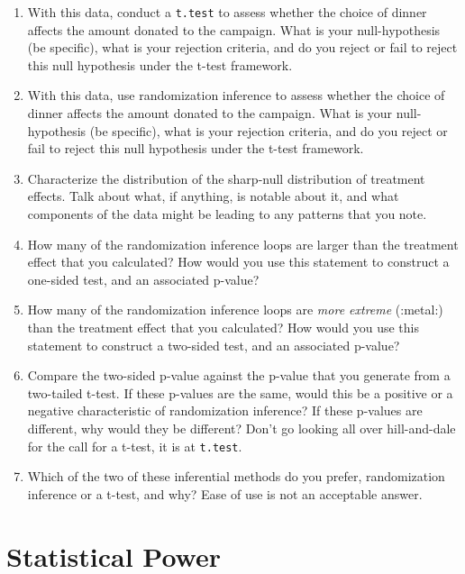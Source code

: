 \documentclass[
]{book}
\begin{document}
\begin{enumerate}
\def\labelenumi{\arabic{enumi}.}
\item
  With this data, conduct a \texttt{t.test} to assess whether the choice
  of dinner affects the amount donated to the campaign. What is your
  null-hypothesis (be specific), what is your rejection criteria, and do
  you reject or fail to reject this null hypothesis under the t-test
  framework.
\item
  With this data, use randomization inference to assess whether the
  choice of dinner affects the amount donated to the campaign. What is
  your null-hypothesis (be specific), what is your rejection criteria,
  and do you reject or fail to reject this null hypothesis under the
  t-test framework.
\item
  Characterize the distribution of the sharp-null distribution of
  treatment effects. Talk about what, if anything, is notable about it,
  and what components of the data might be leading to any patterns that
  you note.
\item
  How many of the randomization inference loops are larger than the
  treatment effect that you calculated? How would you use this statement
  to construct a one-sided test, and an associated p-value?
\item
  How many of the randomization inference loops are \emph{more extreme}
  (:metal:) than the treatment effect that you calculated? How would you
  use this statement to construct a two-sided test, and an associated
  p-value?
\item
  Compare the two-sided p-value against the p-value that you generate
  from a two-tailed t-test. If these p-values are the same, would this
  be a positive or a negative characteristic of randomization inference?
  If these p-values are different, why would they be different? Don't go
  looking all over hill-and-dale for the call for a t-test, it is at
  \texttt{t.test}.
\item
  Which of the two of these inferential methods do you prefer,
  randomization inference or a t-test, and why? Ease of use is not an
  acceptable answer.
\end{enumerate}

\hypertarget{statistical-power}{%
\section{Statistical Power}\label{statistical-power}}
\end{document}
